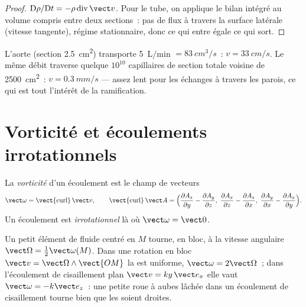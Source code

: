 \begin{proof}
$\mathrm D\rho/\mathrm Dt = -\rho\operatorname{div}\vect v$. Pour le tube, on
applique le bilan intégré au volume compris entre deux sections~: pas de
flux à travers la surface latérale (vitesse tangente), régime stationnaire, donc
ce qui entre égale ce qui sort.
\end{proof}

\begin{example}[Le sang]\label{ex:b2:fluid-kinematics:blood}
L'aorte (section \qty{2.5}{cm^2}) transporte \qty{5}{L/min} $= \qty{83}{cm^3/s}$~:
$v = \qty{33}{cm/s}$. Le même débit traverse quelque $10^{10}$
capillaires de section totale voisine de \qty{2500}{cm^2}~: $v = \qty{0.3}{mm/s}$ ---
assez lent pour les échanges à travers les parois, ce qui est tout l'intérêt de la ramification.
\end{example}

\section{Vorticité et écoulements irrotationnels}

\begin{definition}[Vorticité]\label{def:b2:fluid-kinematics:vorticity}
La \emph{vorticité} d'un écoulement est le champ de vecteurs
\[
\vect\omega = \operatorname{\vect{curl}}\vect v , \qquad
\operatorname{\vect{curl}}\vect A = \Bigl(\frac{\partial A_z}{\partial y} -
\frac{\partial A_y}{\partial z},\; \frac{\partial A_x}{\partial z} - \frac{\partial A_z}
{\partial x},\; \frac{\partial A_y}{\partial x} - \frac{\partial A_x}{\partial y}\Bigr) .
\]
Un écoulement est \emph{irrotationnel} là où $\vect\omega = \vect 0$.
\end{definition}

\begin{proposition}\label{prop:b2:fluid-kinematics:rotation}
Un petit élément de fluide centré en $M$ tourne, en bloc, à la
vitesse angulaire $\vect\Omega = \tfrac12\vect\omega(M)$. Dans une rotation
en bloc $\vect v = \vect\Omega\wedge\vect{OM}$ la  est uniforme,
$\vect\omega = 2\vect\Omega$~; dans l'écoulement de cisaillement plan $\vect v = ky\,\vect e_x$
elle vaut $\vect\omega = -k\vect e_z$~: une petite roue à aubes lâchée dans un écoulement de cisaillement
tourne bien que les  soient droites.
\end{proposition}

